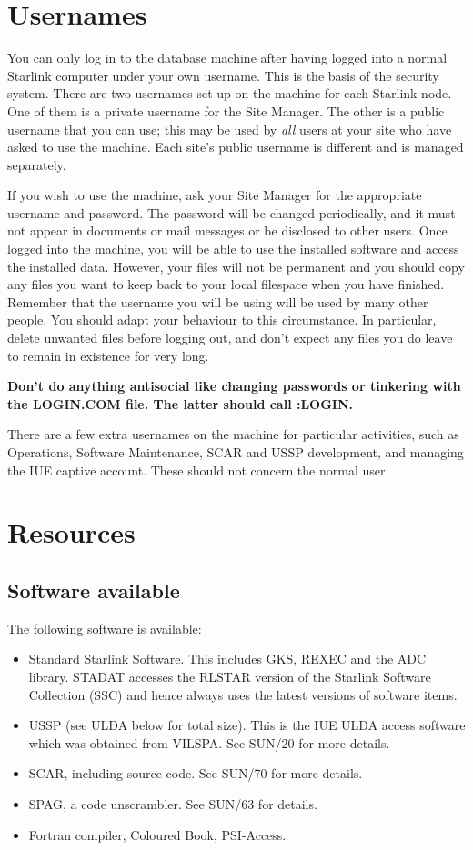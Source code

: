 \section{Usernames}

You can only log in to
the database machine after having logged into a
normal Starlink computer under your own username.
This is the basis of the security system.
There are two usernames set up on the machine for each 
Starlink node.
One of them is a private username for the Site Manager.
The other is a public username that you can use; this may be used
by {\em all} users at your site who have asked to use the machine.
Each site's public username is different and is managed separately.

If you wish to use the machine, ask your Site Manager for the appropriate
username and password.
The password will be changed periodically, and it must not appear in documents
or mail messages or be disclosed to other users.
Once logged into the machine, you will be able to use the installed software and
access the installed data.
However, your files will not be permanent and you should copy any files you
want to keep back to your local filespace when you have finished.
Remember that the username you will be using will be used by many other
people.
You should adapt your behaviour to this circumstance.
In particular, delete unwanted files before logging out, and don't expect
any files you do leave to remain in existence for very long.

{\bf Don't do anything antisocial like changing passwords or tinkering with the
LOGIN.COM file. The latter should call \@SSC:LOGIN.}

There are a few extra usernames on the machine for particular activities,
such as Operations, Software Maintenance, SCAR and USSP development, and
managing the IUE captive account.
These should not concern the normal user.

\section{Resources}

\subsection{Software available}

The following software is available:
\begin{itemize}
\item Standard Starlink Software.
This includes GKS, REXEC and the ADC library.
STADAT accesses the RLSTAR version of the Starlink Software
Collection (SSC) and hence always uses the
latest versions of software items.
\item USSP (see ULDA below for total size).
This is the IUE ULDA access software which was obtained from VILSPA.
See SUN/20 for more details.
\item SCAR, including source code.
See SUN/70 for more details.
\item SPAG, a code unscrambler. See SUN/63 for details.
\item Fortran compiler, Coloured Book, PSI-Access.
\end{itemize}


